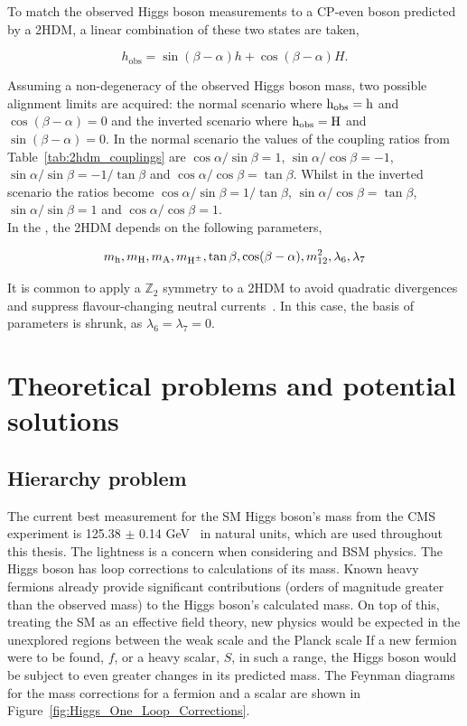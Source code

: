To match the observed Higgs boson measurements to a \ac{CP}-even boson predicted by a \ac{2HDM}, a linear combination of these two states are taken,

\begin{equation}
h_{\text{obs}} = \sin(\beta-\alpha) h + \cos(\beta-\alpha) H.
\end{equation}

Assuming a non-degeneracy of the observed Higgs boson mass, two possible alignment limits are acquired: the normal scenario where ${\text{h}}_{\text{obs}}={\text{h}}$ and $\cos(\beta-\alpha)=0$ and the inverted scenario where ${\text{h}}_{\text{obs}}={\text{H}}$ and $\sin(\beta-\alpha)=0$.
In the normal scenario the values of the coupling ratios from Table~\ref{tab:2hdm_couplings} are $\cos\alpha/\sin\beta=1$, $\sin\alpha/\cos\beta=-1$, $\sin\alpha/\sin\beta=-1/\tan\beta$ and $\cos\alpha/\cos\beta=\tan\beta$. 
Whilst in the inverted scenario the ratios become $\cos\alpha/\sin\beta=1/\tan\beta$, $\sin\alpha/\cos\beta=\tan\beta$, $\sin\alpha/\sin\beta=1$ and $\cos\alpha/\cos\beta=1$. \\

In the , the \ac{2HDM} depends on the following parameters,

\begin{equation}
m_{{\text{h}}}, m_{{\text{H}}}, m_{{\text{A}}}, m_{{\text{H}^{\pm}}}, \tan\beta, \cos(\beta-\alpha), m_{12}^{2}, \lambda_{6}, \lambda_{7}
\end{equation}

It is common to apply a $\mathbb{Z}_2$ symmetry to a \ac{2HDM} to avoid quadratic divergences and suppress flavour-changing neutral currents~\cite{PhysRevD.15.1958,Ginzburg:2004vp}.
In this case, the basis of parameters is shrunk, as $\lambda_6 = \lambda_7 = 0$.

\section{Theoretical problems and potential solutions}

\subsection{Hierarchy problem}

The current best measurement for the \ac{SM} Higgs boson’s mass from the \ac{CMS} experiment is 125.38 $\pm$ 0.14 GeV~\cite{CMS:2020xrn} in natural units, which are used throughout this thesis.
The lightness is a concern when considering  and \ac{BSM} physics. 
The Higgs boson has loop corrections to calculations of its mass. 
Known heavy fermions already provide significant contributions (orders of magnitude greater than the observed mass) to the Higgs boson’s calculated mass. 
On top of this, treating the \ac{SM} as an effective field theory, new physics would be expected in the unexplored regions between the weak scale and the Planck scale
If a new fermion were to be found, $f$, or a heavy scalar, $S$, in such a range, the Higgs boson would be subject to even greater changes in its predicted mass. 
The Feynman diagrams for the mass corrections for a fermion and a scalar are shown in Figure~\ref{fig:Higgs_One_Loop_Corrections}.


